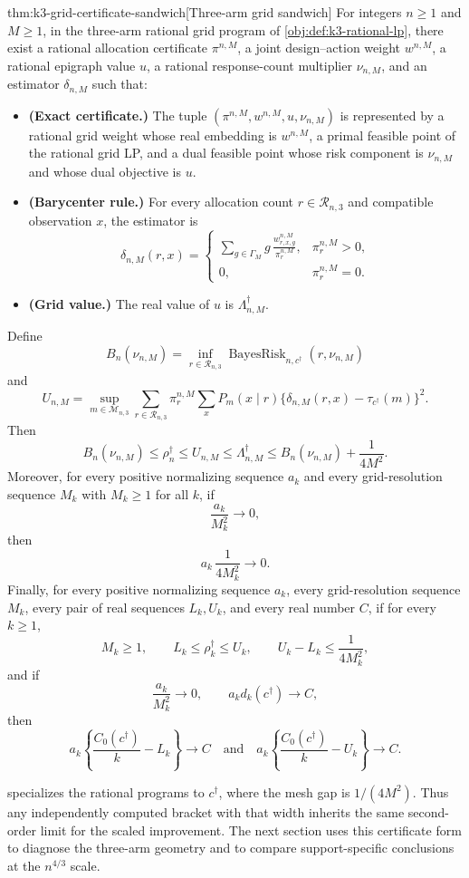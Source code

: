 \begin{theoremv}{thm:k3-grid-certificate-sandwich}[Three-arm grid sandwich]
For integers \(n\ge 1\) and \(M\ge 1\), in the three-arm rational grid program of \cref{obj:def:k3-rational-lp}, there exist a rational allocation certificate \(\pi^{n,M}\), a joint design--action weight \(w^{n,M}\), a rational epigraph value \(u\), a rational response-count multiplier \(\nu_{n,M}\), and an estimator \(\delta_{n,M}\) such that:
\begin{itemize}
\item \textbf{(Exact certificate.)} The tuple \((\pi^{n,M},w^{n,M},u,\nu_{n,M})\) is represented by a rational grid weight whose real embedding is \(w^{n,M}\), a primal feasible point of the rational grid LP, and a dual feasible point whose risk component is \(\nu_{n,M}\) and whose dual objective is \(u\).
\item \textbf{(Barycenter rule.)} For every allocation count \(r\in\mathcal R_{n,3}\) and compatible observation \(x\), the estimator is
\[
\delta_{n,M}(r,x)
=
\begin{cases}
\displaystyle
\sum_{g\in\Gamma_M} g\,\frac{w_{r,x,g}^{n,M}}{\pi_r^{n,M}},
& \pi_r^{n,M}>0,\\[1ex]
0, & \pi_r^{n,M}=0.
\end{cases}
\]
\item \textbf{(Grid value.)} The real value of \(u\) is \(\Lambda_{n,M}^\dagger\).
\end{itemize}
Define
\[
B_n(\nu_{n,M})
=
\inf_{r\in\mathcal R_{n,3}}
\operatorname{BayesRisk}_{n,c^\dagger}(r,\nu_{n,M})
\]
and
\[
U_{n,M}
=
\sup_{m\in\mathcal M_{n,3}}
\sum_{r\in\mathcal R_{n,3}}\pi_r^{n,M}
\sum_x
P_m(x\mid r)
\{\delta_{n,M}(r,x)-\tau_{c^\dagger}(m)\}^2 .
\]
Then
\[
B_n(\nu_{n,M})
\le
\rho_n^\dagger
\le
U_{n,M}
\le
\Lambda_{n,M}^\dagger
\le
B_n(\nu_{n,M})+\frac{1}{4M^2}.
\]
Moreover, for every positive normalizing sequence \(a_k\) and every grid-resolution sequence \(M_k\) with \(M_k\ge 1\) for all \(k\), if
\[
\frac{a_k}{M_k^2}\longrightarrow 0,
\]
then
\[
a_k\,\frac{1}{4M_k^2}\longrightarrow 0.
\]
Finally, for every positive normalizing sequence \(a_k\), every grid-resolution sequence \(M_k\), every pair of real sequences \(L_k,U_k\), and every real number \(C\), if for every \(k\ge 1\),
\[
M_k\ge 1,\qquad
L_k\le \rho_k^\dagger\le U_k,\qquad
U_k-L_k\le \frac{1}{4M_k^2},
\]
and if
\[
\frac{a_k}{M_k^2}\longrightarrow 0,
\qquad
a_k d_k(c^\dagger)\longrightarrow C,
\]
then
\[
a_k\left\{\frac{C_0(c^\dagger)}{k}-L_k\right\}\longrightarrow C
\quad\text{and}\quad
a_k\left\{\frac{C_0(c^\dagger)}{k}-U_k\right\}\longrightarrow C .
\]
\end{theoremv}

 specializes the rational programs to \(c^\dagger\), where the mesh gap is \(1/(4M^2)\). Thus any independently computed bracket with that width inherits the same second-order limit for the scaled improvement. The next section uses this certificate form to diagnose the three-arm geometry and to compare support-specific conclusions at the \(n^{4/3}\) scale.
